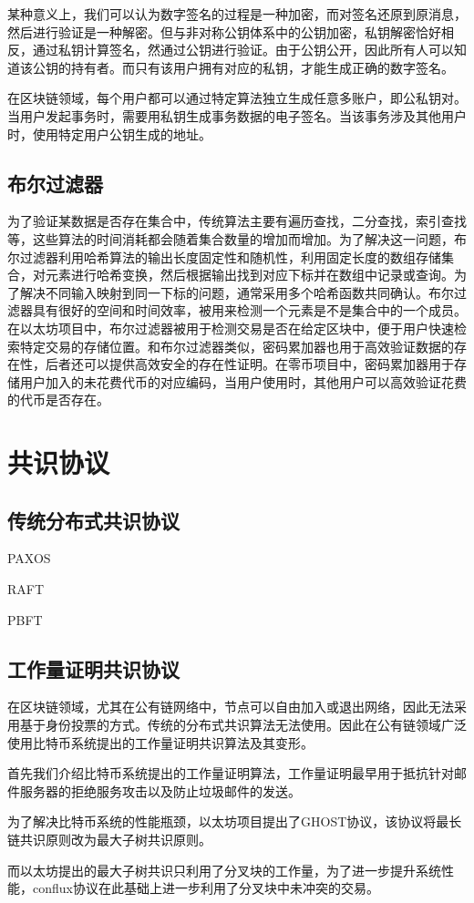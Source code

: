 某种意义上，我们可以认为数字签名的过程是一种加密，而对签名还原到原消息，然后进行验证是一种解密。但与非对称公钥体系中的公钥加密，私钥解密恰好相反，通过私钥计算签名，然通过公钥进行验证。由于公钥公开，因此所有人可以知道该公钥的持有者。而只有该用户拥有对应的私钥，才能生成正确的数字签名。

在区块链领域，每个用户都可以通过特定算法独立生成任意多账户，即公私钥对。当用户发起事务时，需要用私钥生成事务数据的电子签名。当该事务涉及其他用户时，使用特定用户公钥生成的地址。

\subsection{布尔过滤器}

为了验证某数据是否存在集合中，传统算法主要有遍历查找，二分查找，索引查找等，这些算法的时间消耗都会随着集合数量的增加而增加。为了解决这一问题，布尔过滤器利用哈希算法的输出长度固定性和随机性，利用固定长度的数组存储集合，对元素进行哈希变换，然后根据输出找到对应下标并在数组中记录或查询。为了解决不同输入映射到同一下标的问题，通常采用多个哈希函数共同确认。布尔过滤器具有很好的空间和时间效率，被用来检测一个元素是不是集合中的一个成员。在以太坊项目中，布尔过滤器被用于检测交易是否在给定区块中，便于用户快速检索特定交易的存储位置。和布尔过滤器类似，密码累加器也用于高效验证数据的存在性，后者还可以提供高效安全的存在性证明。在零币项目中，密码累加器用于存储用户加入的未花费代币的对应编码，当用户使用时，其他用户可以高效验证花费的代币是否存在。

\section{共识协议}

\subsection{传统分布式共识协议}
\label{subsec:traditional-consensus}

PAXOS

RAFT

PBFT

\subsection{工作量证明共识协议}
\label{subsec:work-proof}

在区块链领域，尤其在公有链网络中，节点可以自由加入或退出网络，因此无法采用基于身份投票的方式。传统的分布式共识算法无法使用。因此在公有链领域广泛使用比特币系统提出的工作量证明共识算法及其变形。

首先我们介绍比特币系统提出的工作量证明算法，工作量证明最早用于抵抗针对邮件服务器的拒绝服务攻击以及防止垃圾邮件的发送。

为了解决比特币系统的性能瓶颈，以太坊项目提出了GHOST协议，该协议将最长链共识原则改为最大子树共识原则。

而以太坊提出的最大子树共识只利用了分叉块的工作量，为了进一步提升系统性能，conflux协议在此基础上进一步利用了分叉块中未冲突的交易。


